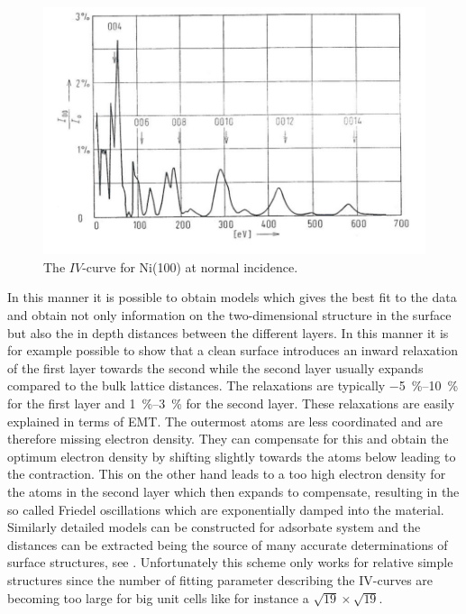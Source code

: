 \begin{figure}[h!]
	\begin{center}
	\includegraphics[scale=4]{figures/09_15.png}
	\caption{The $IV$-curve for Ni(100) at normal incidence.}
	\label{fig:ivni}
	\end{center}
\end{figure}

In this manner it is possible to obtain models which gives the best fit to the  data and obtain not only information on the two-dimensional structure in the surface but also the in depth distances between the different layers. In this manner it is for example possible to show that a clean  surface introduces an inward relaxation of the first layer towards the second while the second layer usually expands compared to the bulk lattice distances. The relaxations are typically \SIrange{-5}{10}{\percent} for the first layer and \SIrange{1}{3}{\percent} for the second layer. These relaxations are easily explained in terms of EMT. The outermost atoms are less coordinated and are therefore missing electron density. They can compensate for this and obtain the optimum electron density by shifting slightly towards the atoms below leading to the contraction. This on the other hand leads to a too high electron density for the atoms in the second layer which then expands to compensate, resulting in the so called Friedel oscillations which are exponentially damped into the material. Similarly detailed models can be constructed for adsorbate system and the distances can be extracted being the source of many accurate determinations of surface structures, see \cite{Somorjai}. Unfortunately this scheme only works for relative simple structures since the number of fitting parameter describing the IV-curves  are becoming too large for big unit cells like for instance a $\sqrt{19}\times\sqrt{19}$.

